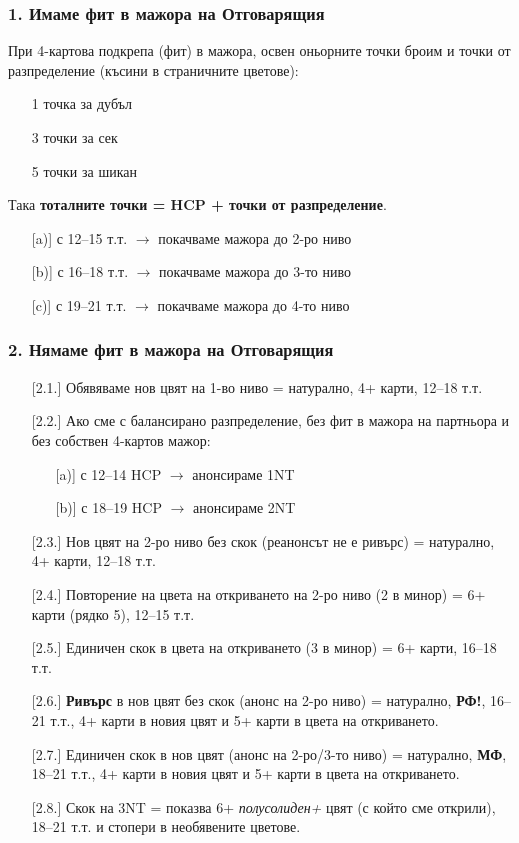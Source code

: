 \documentclass[10pt,a5paper]{extarticle}
\begin{document}
\subsubsection*{1. Имаме фит в мажора на Отговарящия}
При 4-картова подкрепа (фит) в мажора, освен оньорните точки броим и точки от разпределение (късини в страничните цветове):  
\begin{itemize}
  \item[] 1 точка за дубъл
  \item[] 3 точки за сек
  \item[] 5 точки за шикан
\end{itemize}
Така \textbf{тоталните точки = HCP + точки от разпределение}.
\begin{itemize}
  \item[][a)] с 12–15 т.т. $\rightarrow$ покачваме мажора до 2-ро ниво
  \item[][b)] с 16–18 т.т. $\rightarrow$ покачваме мажора до 3-то ниво
  \item[][c)] с 19–21 т.т. $\rightarrow$ покачваме мажора до 4-то ниво
\end{itemize}

\subsubsection*{2. Нямаме фит в мажора на Отговарящия}
\begin{itemize}
  \item[][2.1.] Обявяваме нов цвят на 1-во ниво = натурално, 4+ карти, 12–18 т.т.
  \item[][2.2.] Ако сме с балансирано разпределение, без фит в мажора на партньора и без собствен 4-картов мажор:
    \begin{itemize}
      \item[][a)] с 12–14 HCP $\rightarrow$ анонсираме 1NT
      \item[][b)] с 18–19 HCP $\rightarrow$ анонсираме 2NT
    \end{itemize}
  \item[][2.3.] Нов цвят на 2-ро ниво без скок (реанонсът не е ривърс) = натурално, 4+ карти, 12–18 т.т.
  \item[][2.4.] Повторение на цвета на откриването на 2-ро ниво (2 в минор) = 6+ карти (рядко 5), 12–15 т.т.
  \item[][2.5.] Единичен скок в цвета на откриването (3 в минор) = 6+ карти, 16–18 т.т.
  \item[][2.6.] \textbf{Ривърс} в нов цвят без скок (анонс на 2-ро ниво) = натурално, \textbf{РФ!}, 16–21 т.т., 4+ карти в новия цвят и 5+ карти в цвета на откриването.
  \item[][2.7.] Единичен скок в нов цвят (анонс на 2-ро/3-то ниво) = натурално, \textbf{МФ}, 18–21 т.т., 4+ карти в новия цвят и 5+ карти в цвета на откриването.
  \item[][2.8.] Скок на 3NT = показва 6+ \emph{полусолиден+} цвят (с който сме открили), 18–21 т.т. и стопери в необявените цветове.
\end{itemize}
\newpage
\end{document}
